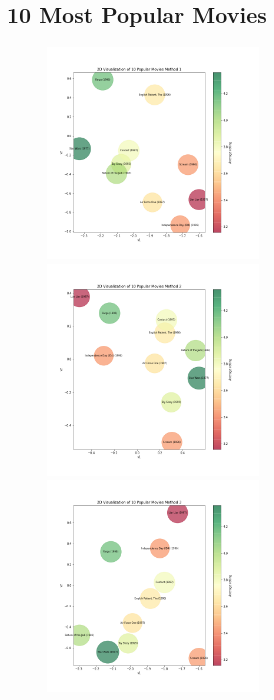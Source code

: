 \documentclass{article}
\begin{document}
\newpage

\subsection{10 Most Popular Movies}

\begin{figure}[H]
\includegraphics[width=0.5\textwidth]{matrixfactorization/2D Visualization of 10 Popular Movies Method 1.png}
\includegraphics[width=0.5\textwidth]{matrixfactorization/2D Visualization of 10 Popular Movies Method 2.png}
\includegraphics[width=0.5\textwidth]{matrixfactorization/2D Visualization of 10 Popular Movies Method 3.png}
\end{figure}
\end{document}
